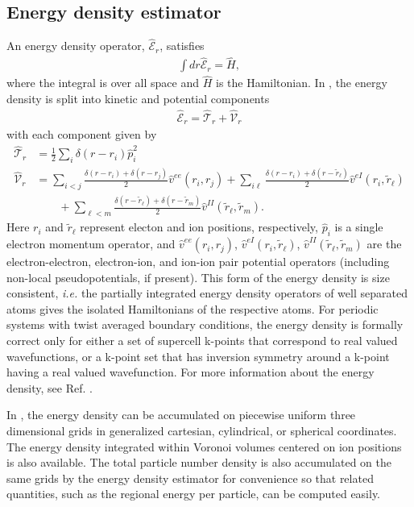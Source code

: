 \subsection{Energy density estimator}
An energy density operator, $\hat{\mathcal{E}}_r$,  satisfies
\begin{align}
  \int dr \hat{\mathcal{E}}_r = \hat{H},
\end{align}
where the integral is over all space and $\hat{H}$ is the Hamiltonian.  In \qmcpack, the energy density is split into kinetic and potential components
\begin{align}
  \hat{\mathcal{E}}_r = \hat{\mathcal{T}}_r + \hat{\mathcal{V}}_r 
\end{align}
with each component given by
\begin{align}
   \hat{\mathcal{T}}_r &=  \frac{1}{2}\sum_i\delta(r-r_i)\hat{p}_i^2 \\  
   \hat{\mathcal{V}}_r &=  \sum_{i<j}\frac{\delta(r-r_i)+\delta(r-r_j)}{2}\hat{v}^{ee}(r_i,r_j)
              + \sum_{i\ell}\frac{\delta(r-r_i)+\delta(r-\tilde{r}_\ell)}{2}\hat{v}^{eI}(r_i,\tilde{r}_\ell) \nonumber\\ 
    &\qquad   + \sum_{\ell< m}\frac{\delta(r-\tilde{r}_\ell)+\delta(r-\tilde{r}_m)}{2}\hat{v}^{II}(\tilde{r}_\ell,\tilde{r}_m).\nonumber
\end{align}
Here $r_i$ and $\tilde{r}_\ell$ represent electon and ion positions, respectively, $\hat{p}_i$ is a single electron momentum operator, and $\hat{v}^{ee}(r_i,r_j)$, $\hat{v}^{eI}(r_i,\tilde{r}_\ell)$, $\hat{v}^{II}(\tilde{r}_\ell,\tilde{r}_m)$ are the electron-electron, electron-ion, and ion-ion pair potential operators (including non-local pseudopotentials, if present).  This form of the energy density is size consistent, \textit{i.e.} the partially integrated energy density operators of well separated atoms gives the isolated Hamiltonians of the respective atoms.  For periodic systems with twist averaged boundary conditions, the energy density is formally correct only for either a set of supercell k-points that correspond to real valued wavefunctions, or a k-point set that has inversion symmetry around a k-point having a real valued wavefunction.  For more information about the energy density, see Ref. \cite{Krogel2013}.

In \qmcpack, the energy density can be accumulated on piecewise uniform three dimensional grids in generalized cartesian, cylindrical, or spherical coordinates.  The energy density integrated within Voronoi volumes centered on ion positions is also available.  The total particle number density is also accumulated on the same grids by the energy density estimator for convenience so that related quantities, such as the regional energy per particle, can be computed easily.


